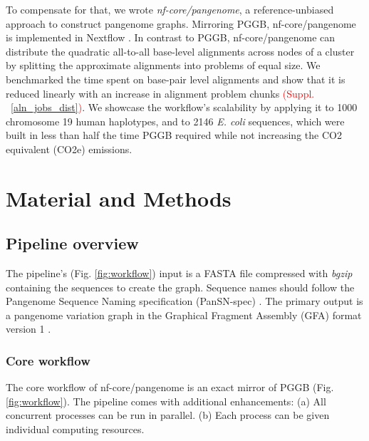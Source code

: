 \documentclass{bioinfo}
\theoremstyle{definition}
\newcommand{\red}[1]{{\textcolor{Red}{#1}}}
\begin{document}
	To compensate for that, we wrote \textit{nf-core/pangenome}, a reference-unbiased approach to construct pangenome graphs. 
	Mirroring PGGB, nf-core/pangenome is implemented in Nextflow \citep{DiTommaso2017}.
	In contrast to PGGB, nf-core/pangenome can distribute the quadratic all-to-all base-level alignments across nodes of a cluster by splitting the approximate alignments into problems of equal size. 
	We benchmarked the time spent on base-pair level alignments and show that it is reduced linearly with an increase in alignment problem chunks \red{(Suppl. ~\ref{aln_jobs_dist})}. 
	We showcase the workflow’s scalability by applying it to 1000 chromosome 19 human haplotypes, and to 2146 \textit{E. coli} sequences, which were built in less than half the time PGGB required while not increasing the CO2 equivalent (CO2e) emissions.
	\vspace{-0.6cm}
	\section{Material and Methods}
	
	\subsection{Pipeline overview}
	The pipeline’s (Fig. \ref{fig:workflow}) input is a FASTA file compressed with \textit{bgzip} \citep{Li2009} containing the sequences to create the graph. 
	Sequence names should follow the Pangenome Sequence Naming specification (PanSN-spec) \citep{pansn-spec}. 
	The primary output is a pangenome variation graph \citep{Garrison:2018} in the Graphical Fragment Assembly (GFA) format version 1 \citep{GFA}.
	
	

	\subsubsection{Core workflow}
	
	The core workflow of nf-core/pangenome is an exact mirror of PGGB (Fig. \ref{fig:workflow}).
	The pipeline comes with additional enhancements: (a) All concurrent processes can be run in parallel. (b) Each process can be given individual computing resources. 
	
\end{document}
